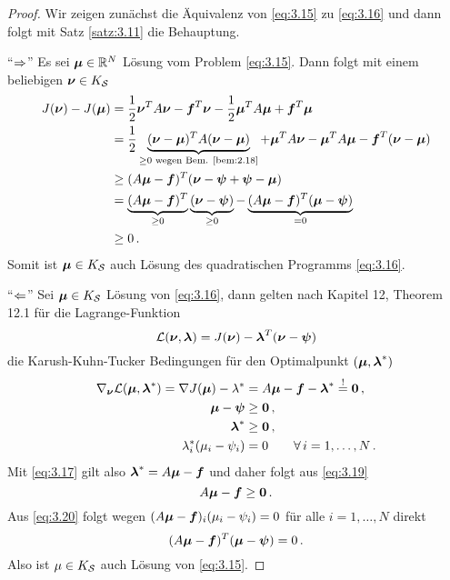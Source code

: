 \begin{proof}
Wir zeigen zunächst die Äquivalenz von \eqref{eq:3.15} zu \eqref{eq:3.16} und dann folgt mit Satz \ref{satz:3.11} die Behauptung.

"`$\Rightarrow$"' Es sei $\boldsymbol\mu \in \mathbb{R}^N$ Lösung vom Problem \eqref{eq:3.15}. Dann folgt mit einem beliebigen $\boldsymbol\nu \in K_{\mathcal S}$
\begin{align*}
	J(\boldsymbol\nu) - J(\boldsymbol\mu) & =  \frac 1 2 \boldsymbol \nu^T A \boldsymbol \nu - \boldsymbol f^T \boldsymbol \nu -  \frac 1 2 \boldsymbol \mu^T A \boldsymbol \mu + \boldsymbol f^T \boldsymbol \mu \\
	& = \frac 1 2\underbrace{ (\boldsymbol\nu-\boldsymbol \mu)^T A(\boldsymbol\nu-\boldsymbol\mu) }_{\ge 0 \text{ wegen Bem. \ref{bem:2.18}}}+ \boldsymbol \mu^T A \boldsymbol \nu - \boldsymbol \mu ^TA \boldsymbol\mu - \boldsymbol f^T (\boldsymbol\nu-\boldsymbol\mu) \\
	& \ge (A\boldsymbol \mu - \boldsymbol f)^T(\boldsymbol\nu-\boldsymbol\psi+\boldsymbol\psi-\boldsymbol\mu) \\
	& = \underbrace{(A\boldsymbol \mu - \boldsymbol f)^T}_{\ge 0} \underbrace{(\boldsymbol\nu-\boldsymbol\psi)}_{\ge 0}- \underbrace{(A\boldsymbol \mu - \boldsymbol f)^T(\boldsymbol\mu-\boldsymbol\psi) }_{=0}\\
	&  \ge 0\, .
\end{align*}
Somit ist $\boldsymbol\mu \in K_{\mathcal S}$ auch Lösung des quadratischen Programms \eqref{eq:3.16}.

"`$\Leftarrow$"' Sei $\boldsymbol\mu \in K_{\mathcal S}$ Lösung von \eqref{eq:3.16}, dann gelten nach \cite{NocWri} Kapitel 12, Theorem 12.1 für die Lagrange-Funktion
\[
	\mathcal L(\boldsymbol\nu,\boldsymbol\lambda) = J(\boldsymbol\nu)-\boldsymbol\lambda^T(\boldsymbol\nu-\boldsymbol\psi)
\]
die Karush-Kuhn-Tucker Bedingungen für den Optimalpunkt $(\boldsymbol \mu,\boldsymbol\lambda^*)$
\begin{subequations}
\begin{align}\label{eq:3.17}
	\nabla_{\boldsymbol\nu} \mathcal L(\boldsymbol\mu,\boldsymbol\lambda^*) = \nabla J(\boldsymbol\mu)-\lambda^* & = A\boldsymbol\mu-\boldsymbol f - \boldsymbol \lambda^* \stackrel != \boldsymbol 0 \, ,\\
	\label{eq:3.18}
	\boldsymbol\mu - \boldsymbol \psi & \ge \boldsymbol 0 \, , \\
	\label{eq:3.19}
	\boldsymbol \lambda^* & \ge \boldsymbol 0 \, , \\
	\label{eq:3.20}
	\lambda_i^* (\mu_i-\psi_i) & = 0 \qquad \forall \, i =1,\ldots,N \, .
\end{align}
\end{subequations}
Mit \eqref{eq:3.17} gilt also $\boldsymbol\lambda^* = A\boldsymbol\mu-\boldsymbol f$ und daher folgt aus \eqref{eq:3.19}
\[
	A\boldsymbol\mu - \boldsymbol f \ge\boldsymbol 0 \, .
\]
Aus \eqref{eq:3.20} folgt wegen $(A\boldsymbol\mu-\boldsymbol f)_i (\mu_i-\psi_i) = 0$ für alle $i = 1,\ldots,N$ direkt
\[
	(A\boldsymbol\mu - \boldsymbol f)^T (\boldsymbol \mu-\boldsymbol\psi) = 0\, .
\]
Also ist $\mu \in K_{\mathcal S}$ auch Lösung von \eqref{eq:3.15}.
\end{proof}


